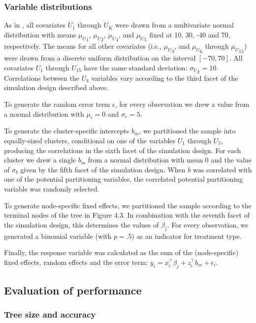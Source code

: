 \documentclass[nobf,doc]{apa}
\begin{document}
\subsubsection{Variable distributions}

As in , all covariates $U_1$ through $U_{K}$ were drawn from a multivariate normal distribution with means ${\mu_U}_1$, ${\mu_U}_2$, ${\mu_U}_4$, and ${\mu_U}_5$ fixed at 10, 30, -40 and 70, respectively. The means for all other covariates (i.e., ${\mu_U}_3$, and ${\mu_U}_6$ through ${\mu_U}_{15}$) were drawn from a discrete uniform distribution on the interval $[-70,70]$. All covariates $U_1$ through $U_{15}$ have the same standard deviation: ${\sigma_U}_k = 10$. Correlations between the $U_k$ variables vary according to the third facet of the simulation design described above.

To generate the random error term $\epsilon$, for every observation we drew a value from a normal distribution with $\mu_{\epsilon} = 0$ and $\sigma_{\epsilon} = 5$. 

To generate the cluster-specific intercepts $b_m$, we partitioned the sample into equally-sized clusters, conditional on one of the variables $U_1$ through $U_5$, producing the correlations in the sixth facet of the simulation design. For each cluster we drew a single $b_m$ from a normal distribution with mean 0 and the value of $\sigma_{b}$ given by the fifth facet of the simulation design. When $b$ was correlated with one of the potential partitioning variables, the correlated potential partitioning variable was randomly selected.

To generate node-specific fixed effects, we partitioned the sample according to the terminal nodes of the tree in Figure 4.3. In combination with the seventh facet of the simulation design, this determines the values of $\beta_j$. For every observation, we generated a binomial variable (with $p =.5$) as an indicator for treatment type. 

Finally, the response variable was calculated as the sum of the (node-specific) fixed effects, random effects and the error term: $y_{i} = x_{i}^{\top} \beta_{j} + z_{i}^{\top} b_{m} + \epsilon_{i}$.




\subsection{Evaluation of performance}

\subsubsection{Tree size and accuracy} 
\end{document}
